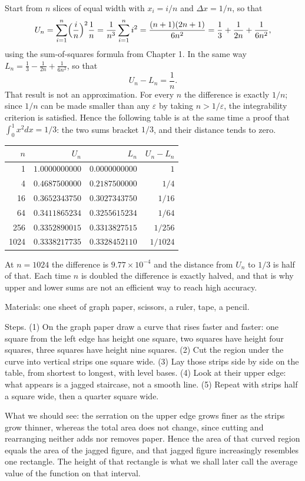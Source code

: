 Start from $n$ slices of equal width with $x_i=i/n$ and $\Delta x=1/n$, so that
\[
U_n=\sum_{i=1}^{n}\Bigl(\frac{i}{n}\Bigr)^2\frac1n=\frac{1}{n^3}\sum_{i=1}^{n}i^2
=\frac{(n+1)(2n+1)}{6n^2}=\frac13+\frac{1}{2n}+\frac{1}{6n^2},
\]
using the sum-of-squares formula from Chapter 1. In the same way
$L_n=\frac13-\frac{1}{2n}+\frac{1}{6n^2}$, so that
\begin{equation}
U_n-L_n=\frac1n .
\end{equation}
That result is not an approximation. For every $n$ the difference is exactly $1/n$; since $1/n$ can
be made smaller than any $\varepsilon$ by taking $n>1/\varepsilon$, the integrability
criterion is satisfied. Hence the following table is at the same time a proof that
$\int_0^1x^2dx=1/3$: the two sums bracket $1/3$, and their distance tends to zero.

\begin{center}\small
\begin{tabular}{rrrr}
\hline
$n$ & $U_n$ & $L_n$ & $U_n-L_n$ \\
\hline
1 & $1.0000000000$ & $0.0000000000$ & $1$ \\
4 & $0.4687500000$ & $0.2187500000$ & $1/4$ \\
16 & $0.3652343750$ & $0.3027343750$ & $1/16$ \\
64 & $0.3411865234$ & $0.3255615234$ & $1/64$ \\
256 & $0.3352890015$ & $0.3313827515$ & $1/256$ \\
1024 & $0.3338217735$ & $0.3328452110$ & $1/1024$ \\
\hline
\end{tabular}
\end{center}

At $n=1024$ the difference is $9.77\times10^{-4}$ and the distance from $U_n$ to $1/3$ is half of that.
Each time $n$ is doubled the difference is exactly halved, and that is why upper and lower
sums are not an efficient way to reach high accuracy.

\begin{tangan}
Materials: one sheet of graph paper, scissors, a ruler, tape, a pencil.

Steps. (1) On the graph paper draw a curve that rises faster and faster: one square from the
left edge has height one square, two squares have height four squares, three squares have height
nine squares. (2) Cut the region under the curve into vertical strips one square wide.
(3) Lay those strips side by side on the table, from shortest to longest, with level
bases. (4) Look at their upper edge: what appears is a jagged staircase, not a smooth line.
(5) Repeat with strips half a square wide, then a quarter square wide.

What we should see: the serration on the upper edge grows finer as the strips grow thinner,
whereas the total area does not change, since cutting and rearranging neither adds nor removes
paper. Hence the area of that curved region equals the area of the jagged figure, and that jagged
figure increasingly resembles one rectangle. The height of that rectangle is what we shall later call
the average value of the function on that interval.
\end{tangan}

